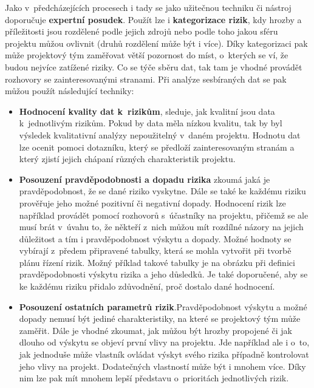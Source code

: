 Jako v~předcházejících procesech i tady se jako užitečnou techniku či nástroj doporučuje \textbf{expertní posudek}. Použít lze i \textbf{kategorizace rizik}, kdy hrozby a příležitosti jsou rozdělené podle jejich zdrojů nebo podle toho jakou sféru projektu můžou ovlivnit (druhů rozdělení může být i více). Díky kategorizaci pak může projektový tým zaměřovat větší pozornost do míst, o~kterých se ví, že budou nejvíce zatížené riziky.  Co se týče sběru dat, tak tam je vhodné provádět rozhovory se zainteresovanými stranami. Při analýze sesbíraných dat se pak můžou použít následující techniky:
\begin{itemize}
    \item \textbf{Hodnocení kvality dat k~rizikům}, sleduje, jak kvalitní jsou data k~jednotlivým rizikům. Pokud by data měla nízkou kvalitu, tak by byl výsledek kvalitativní analýzy nepoužitelný v~daném projektu. Hodnotu dat lze ocenit pomoci dotazníku, který se předloží zainteresovaným stranám a který zjistí jejich chápaní různých charakteristik projektu. 
    \item \textbf{Posouzení pravděpodobnosti a dopadu rizika} zkoumá jaká je pravděpodobnost, že se dané riziko vyskytne. Dále se také ke každému riziku prověřuje jeho možné pozitivní či negativní dopady. Hodnocení rizik lze například provádět pomocí rozhovorů s~účastníky na projektu, přičemž se ale musí brát v~úvahu to, že někteří z~nich můžou mít rozdílné názory na jejich důležitost a tím i pravděpodobnost výskytu a dopady. Možné hodnoty se vybírají z~předem připravené tabulky, která se mohla vytvořit při tvorbě plánu řízení rizik. Možný příklad takové tabulky je na obrázku při definici pravděpodobnosti výskytu rizika a jeho důsledků. Je také doporučené, aby se ke každému riziku přidalo zdůvodnění, proč dostalo dané hodnocení. 
    \item \textbf{Posouzení ostatních parametrů rizik}.Pravděpodobnost výskytu a možné dopady nemusí být jediné charakteristiky, na které se projektový tým může zaměřit. Dále je vhodné zkoumat, jak můžou být hrozby propojené či jak dlouho od výskytu se objeví první vlivy na projektu. Jde například ale i o~to, jak jednoduše může vlastník ovládat výskyt svého rizika případně kontrolovat jeho vlivy na projekt. Dodatečných vlastností může být i mnohem více. Díky nim lze pak mít mnohem lepší představu o~prioritách jednotlivých rizik. 
\end{itemize}
